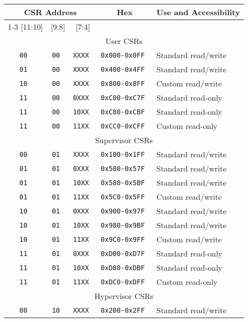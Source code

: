 \begin{table*}[h!]
\begin{center}
\begin{tabular}{|c|c|c|c|l|}
\hline
\multicolumn{3}{|c|}{CSR Address} & Hex & \multicolumn{1}{c|}{Use and Accessibility}\\ \cline{1-3}
[11:10] & [9:8] & [7:4]                  &  & \\
\hline
\multicolumn{5}{|c|}{User CSRs}  \\
\hline
\tt   00   &\tt   00  &\tt   XXXX   & \tt 0x000-0x0FF & Standard read/write \\
\tt   01   &\tt   00  &\tt   XXXX   & \tt 0x400-0x4FF & Standard read/write \\
\tt   10   &\tt   00  &\tt   XXXX   & \tt 0x800-0x8FF & Custom read/write \\
\tt   11   &\tt   00  &\tt   0XXX   & \tt 0xC00-0xC7F & Standard read-only \\
\tt   11   &\tt   00  &\tt   10XX   & \tt 0xC80-0xCBF & Standard read-only \\
\tt   11   &\tt   00  &\tt   11XX   & \tt 0xCC0-0xCFF & Custom read-only \\
\hline
\multicolumn{5}{|c|}{Supervisor CSRs}  \\
\hline
\tt   00   &\tt   01  &\tt   XXXX   & \tt 0x100-0x1FF & Standard read/write \\
\tt   01   &\tt   01  &\tt   0XXX   & \tt 0x500-0x57F & Standard read/write \\
\tt   01   &\tt   01  &\tt   10XX   & \tt 0x580-0x5BF & Standard read/write \\
\tt   01   &\tt   01  &\tt   11XX   & \tt 0x5C0-0x5FF & Custom read/write \\
\tt   10   &\tt   01  &\tt   0XXX   & \tt 0x900-0x97F & Standard read/write \\
\tt   10   &\tt   01  &\tt   10XX   & \tt 0x980-0x9BF & Standard read/write \\
\tt   10   &\tt   01  &\tt   11XX   & \tt 0x9C0-0x9FF & Custom read/write \\
\tt   11   &\tt   01  &\tt   0XXX   & \tt 0xD00-0xD7F & Standard read-only \\
\tt   11   &\tt   01  &\tt   10XX   & \tt 0xD80-0xDBF & Standard read-only \\
\tt   11   &\tt   01  &\tt   11XX   & \tt 0xDC0-0xDFF & Custom read-only \\
\hline
\multicolumn{5}{|c|}{Hypervisor CSRs} \\
\hline
\tt   00   &\tt   10  &\tt   XXXX   & \tt 0x200-0x2FF & Standard read/write \\

\end{tabular}
\end{center}
\end{table*}
